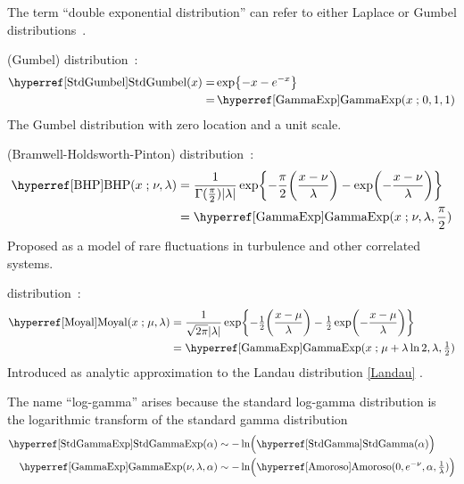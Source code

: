 The term ``double exponential distribution'' can refer to either Laplace or Gumbel distributions~\cite{Johnson1995}.


 (Gumbel) distribution~\cite{Gumbel1958}:
\begin{align}
\label{StdGumbel}
\opr{StdGumbel}(x) 
=&
  \exp\Left\{- x - e^{-x} \Right\}  \checked \\
=& \opr{GammaExp}(x\given 0,1,1)  \notag \checked
\end{align}
The Gumbel distribution with zero location and a unit scale.



 (Bramwell-Holdsworth-Pinton) distribution~\cite{Bramwell1998, Bramwell2000}:
\begin{align}
\label{BHP}
\opr{BHP}(x\given \nu,\lambda) 
&=
\frac{1}{\Gamma(\tfrac{\pi}{2}) |\lambda|}  \exp\Left\{ - \frac{\pi}{2}\Left(\frac{x-\nu}{\lambda}\Right) -  \exp\Left(-\frac{x-\nu}{\lambda}\Right)  \Right\}  \checked
\notag
\\
&= \opr{GammaExp}(x\given \nu,\lambda,\frac{\pi}{2})   \checked
\end{align}
Proposed as a model of rare fluctuations in turbulence and other correlated systems.


 distribution~\cite{Moyal1955}:
\begin{align}
\label{Moyal}
\opr{Moyal}(x\given \mu, \lambda) & = 
\frac{1}{\sqrt{2\pi}  |\lambda|}  \exp\Left\{- \half \Left(\frac{x-\mu}{\lambda}\Right) - \half \exp\Left(- \frac{x-\mu}{\lambda}\Right)  \Right\} \checked
\\
&= \opr{GammaExp}(x\given \mu+ \lambda \ln 2, \lambda ,\half)  \checked
\notag
\end{align}
Introduced as analytic approximation to the  Landau distribution \eqref{Landau} \cite{Moyal1955}.




The name ``log-gamma'' arises because the standard log-gamma distribution is the logarithmic transform of the standard gamma distribution
\begin{align*}
\opr{StdGammaExp}(\alpha)  &\sim - \ln\Bigl( \opr{StdGamma}(\alpha) \Bigr) \checked
\\
\opr{GammaExp}(\nu, \lambda, \alpha)  &\sim -\ln\Bigl( \opr{Amoroso}(0, e^{-\nu},\alpha, \tfrac{1}{\lambda}) \Bigr) \checked
\end{align*}

